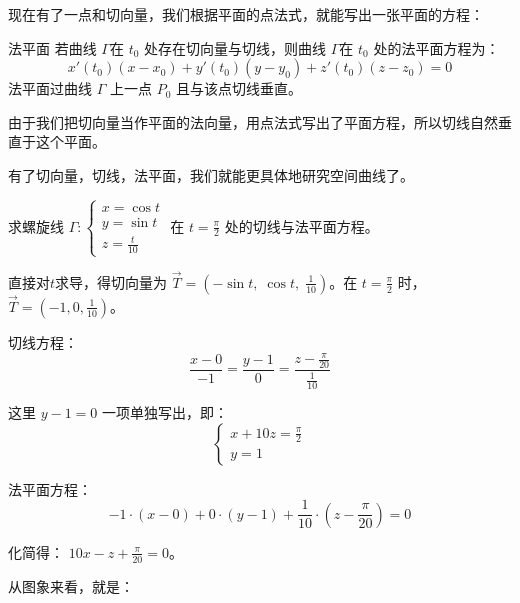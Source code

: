 现在有了一点和切向量，我们根据平面的点法式，就能写出一张平面的方程：

\begin{theorem}{法平面}{}
若曲线 $\Gamma$在 $t_0$ 处存在切向量与切线，则曲线 $\Gamma$在 $t_0$ 处的法平面方程为：
\[
x'(t_0)(x-x_0) + y'(t_0)(y-y_0) + z'(t_0)(z-z_0) = 0
\]
法平面过曲线 $\Gamma$ 上一点 $P_0$ 且与该点切线垂直。
\end{theorem}

由于我们把切向量当作平面的法向量，用点法式写出了平面方程，所以切线自然垂直于这个平面。

有了切向量，切线，法平面，我们就能更具体地研究空间曲线了。

\begin{myexample}
求螺旋线 $\Gamma: 
\begin{cases}
x = \cos t\\
y = \sin t\\
z = \frac{t}{10}
\end{cases}$ 在 $t = \frac{\pi}{2}$ 处的切线与法平面方程。

直接对$t$求导，得切向量为 $\vec{T} = (-\sin t,\; \cos t,\; \frac{1}{10})$。在 $t=\frac{\pi}{2}$ 时，$\vec{T} = (-1,0,\frac{1}{10})$。

切线方程：
\[
\frac{x-0}{-1} = \frac{y-1}{0} = \frac{z-\frac{\pi}{20}}{\frac{1}{10}}
\]

这里 $y-1=0$ 一项单独写出，即： 
\[
\begin{cases} x + 10z = \frac{\pi}{2} \\ y = 1 \end{cases}
\]

法平面方程：
\[
-1\cdot(x-0) + 0\cdot(y-1) + \frac{1}{10} \cdot(z-\frac{\pi}{20}) = 0
\]

化简得： $10x - z + \frac{\pi}{20} = 0$。

从图象来看，就是：
\begin{center}
\end{center}
\end{myexample}
